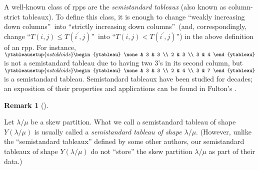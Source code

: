 \documentclass[numbers=enddot,12pt,final,onecolumn,notitlepage]{scrartcl}%
\theoremstyle{definition}
\newtheorem{remk}[theo]{Remark}
\newenvironment{remark}[1][]
{\begin{remk}[#1]\begin{leftbar}}
{\end{leftbar}\end{remk}}
\newenvironment{vershort}{}{}
\begin{document}
A well-known class of rpps are the \textit{semistandard tableaux} (also known
as column-strict tableaux). To define this class, it is enough to change
\textquotedblleft weakly increasing down columns\textquotedblright\ into
\textquotedblleft strictly increasing down columns\textquotedblright\ (and,
correspondingly, change \textquotedblleft$T\left(  i,j\right)  \leq T\left(
i^{\prime},j\right)  $\textquotedblright\ into \textquotedblleft$T\left(
i,j\right)  <T\left(  i^{\prime},j\right)  $\textquotedblright) in the above
definition of an rpp. For instance, $%
\ytableausetup{notabloids}
\begin{ytableau}
\none& 3 & 3 \\
2 & 3 \\
3 & 4
\end{ytableau}%
$ is not a semistandard tableau due to having two $3$'s in its second column,
but $%
\ytableausetup{notabloids}
\begin{ytableau}
\none& 3 & 3 \\
2 & 4 \\
3 & 7
\end{ytableau}%
$ is a semistandard tableau. Semistandard tableaux have been studied for
decades; an exposition of their properties and applications can be found in
Fulton's \cite{Fulton97}.

\begin{vershort}
\begin{remark}
Let $\lambda/\mu$ be a skew partition. What we call a semistandard tableau of
shape $Y\left(  \lambda/\mu\right)  $ is usually called a \textit{semistandard
tableau of shape }$\lambda/\mu$. (However, unlike the ``semistandard
tableaux'' defined by some other authors, our semistandard tableaux of shape
$Y\left(  \lambda/ \mu\right)  $ do not ``store'' the skew partition $\lambda/
\mu$ as part of their data.)
\end{remark}
\end{vershort}
\end{document}
